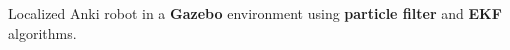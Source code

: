 \item{Localized Anki robot in a \textbf{Gazebo} environment using \textbf{particle filter} and \textbf{EKF} algorithms.}


